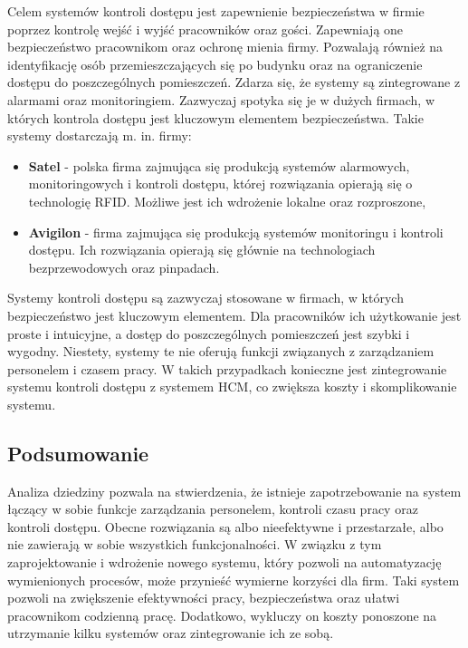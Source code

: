 Celem systemów kontroli dostępu jest zapewnienie bezpieczeństwa w firmie poprzez kontrolę wejść i wyjść pracowników oraz gości. Zapewniają one bezpieczeństwo pracownikom oraz ochronę mienia firmy. Pozwalają również na identyfikację osób przemieszczających się po budynku oraz na ograniczenie dostępu do poszczególnych pomieszczeń. Zdarza się, że systemy są zintegrowane z alarmami oraz monitoringiem. Zazwyczaj spotyka się je w dużych firmach, w których kontrola dostępu jest kluczowym elementem bezpieczeństwa. Takie systemy dostarczają m. in. firmy:

\begin{itemize}
    \item \textbf{Satel} - polska firma zajmująca się produkcją systemów alarmowych, monitoringowych i kontroli dostępu, której rozwiązania opierają się o technologię RFID. Możliwe jest ich wdrożenie lokalne oraz rozproszone,
    \item \textbf{Avigilon} - firma zajmująca się produkcją systemów monitoringu i kontroli dostępu. Ich rozwiązania opierają się głównie na technologiach bezprzewodowych oraz pinpadach.
\end{itemize}

Systemy kontroli dostępu są zazwyczaj stosowane w firmach, w których bezpieczeństwo jest kluczowym elementem. Dla pracowników ich użytkowanie jest proste i intuicyjne, a dostęp do poszczególnych pomieszczeń jest szybki i wygodny. Niestety, systemy te nie oferują funkcji związanych z zarządzaniem personelem i czasem pracy. W takich przypadkach konieczne jest zintegrowanie systemu kontroli dostępu z systemem HCM, co zwiększa koszty i skomplikowanie systemu.

\subsection{Podsumowanie}

Analiza dziedziny pozwala na stwierdzenia, że istnieje zapotrzebowanie na system łączący w sobie funkcje zarządzania personelem, kontroli czasu pracy oraz kontroli dostępu. Obecne rozwiązania są albo nieefektywne i przestarzałe, albo nie zawierają w sobie wszystkich funkcjonalności. W związku z tym zaprojektowanie i wdrożenie nowego systemu, który pozwoli na automatyzację wymienionych procesów, może przynieść wymierne korzyści dla firm. Taki system pozwoli na zwiększenie efektywności pracy, bezpieczeństwa oraz ułatwi pracownikom codzienną pracę. Dodatkowo, wykluczy on koszty ponoszone na utrzymanie kilku systemów oraz zintegrowanie ich ze sobą.

